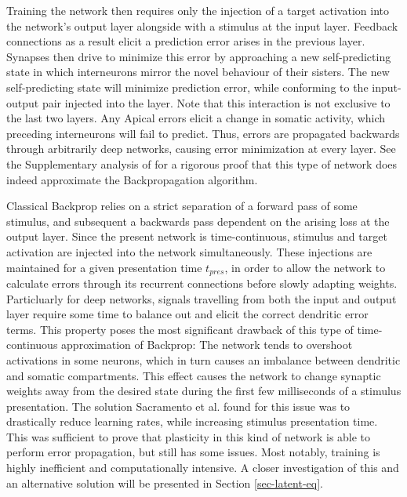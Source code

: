 Training the network then requires only the injection of a target activation into the network's output layer alongside
with a stimulus at the input layer. Feedback connections as a result elicit a prediction error arises in the previous
layer. Synapses then drive to minimize this error by approaching a new self-predicting state in which interneurons
mirror the novel behaviour of their sisters. The new self-predicting state will minimize prediction error, while
conforming to the input-output pair injected into the layer. Note that this interaction is not exclusive to the last two
layers. Any Apical errors elicit a change in somatic activity, which preceding interneurons will fail to predict. Thus,
errors are propagated backwards through arbitrarily deep networks, causing error minimization at every layer. See the
Supplementary analysis of \citep{sacramento2018dendritic} for a rigorous proof that this type of network does indeed
approximate the Backpropagation algorithm.



Classical Backprop relies on a strict separation of a forward pass of some stimulus, and subsequent a backwards pass
dependent on the arising loss at the output layer. Since the present network is time-continuous, stimulus and target
activation are injected into the network simultaneously. These injections are maintained for a given presentation time
$t_{pres}$, in order to allow the network to calculate errors through its recurrent connections before slowly adapting
weights. Particluarly for deep networks, signals travelling from both the input and output layer require some time to
balance out and elicit the correct dendritic error terms. This property poses the most significant drawback of this type
of time-continuous approximation of Backprop: The network tends to overshoot activations in some neurons, which in turn
causes an imbalance between dendritic and somatic compartments. This effect causes the network to change synaptic
weights away from the desired state during the first few milliseconds of a stimulus presentation. The solution
Sacramento et al. found for this issue was to drastically reduce learning rates, while increasing stimulus presentation
time. This was sufficient to prove that plasticity in this kind of network is able to perform error propagation, but
still has some issues. Most notably, training is highly inefficient and computationally intensive. A closer
investigation of this and an alternative solution will be presented in Section \ref{sec-latent-eq}.



